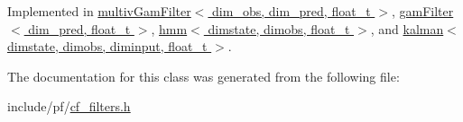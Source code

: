 Implemented in \hyperlink{classmultivGamFilter_ae32c76dd1096041f358962f93de64a99}{multiv\+Gam\+Filter$<$ dim\+\_\+obs, dim\+\_\+pred, float\+\_\+t $>$}, \hyperlink{classgamFilter_a8849fcc87e594367865c14767b8849e8}{gam\+Filter$<$ dim\+\_\+pred, float\+\_\+t $>$}, \hyperlink{classhmm_a588f2aed002614e75f523213eba1b290}{hmm$<$ dimstate, dimobs, float\+\_\+t $>$}, and \hyperlink{classkalman_aaf359a2d65f4f0ae8eb26603205b6f9b}{kalman$<$ dimstate, dimobs, diminput, float\+\_\+t $>$}.



The documentation for this class was generated from the following file\+:\begin{DoxyCompactItemize}
\item 
include/pf/\hyperlink{cf__filters_8h}{cf\+\_\+filters.\+h}\end{DoxyCompactItemize}
